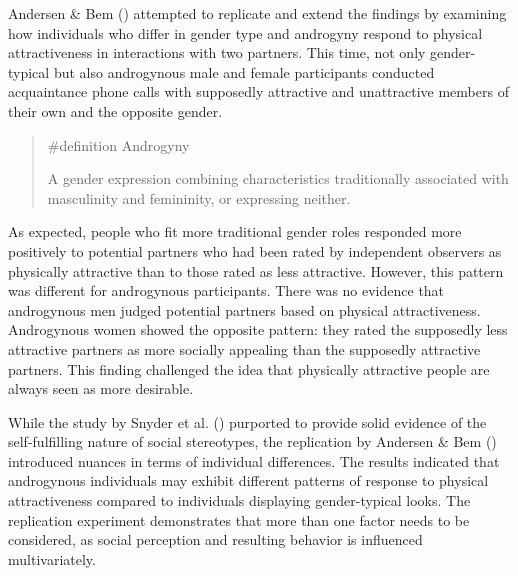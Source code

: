 \documentclass[
  letterpaper,
]{book}
\begin{document}
Andersen \& Bem () attempted to
replicate and extend the findings by examining how individuals who
differ in gender type and androgyny respond to physical attractiveness
in interactions with two partners. This time, not only gender-typical
but also androgynous male and female participants conducted acquaintance
phone calls with supposedly attractive and unattractive members of their
own and the opposite gender.

\begin{quote}
\label{def-androgyny}{\#definition} Androgyny

A gender expression combining characteristics traditionally associated
with masculinity and femininity, or expressing neither.
\end{quote}

As expected, people who fit more traditional gender roles responded more
positively to potential partners who had been rated by independent
observers as physically attractive than to those rated as less
attractive. However, this pattern was different for androgynous
participants. There was no evidence that androgynous men judged
potential partners based on physical attractiveness. Androgynous women
showed the opposite pattern: they rated the supposedly less attractive
partners as more socially appealing than the supposedly attractive
partners. This finding challenged the idea that physically attractive
people are always seen as more desirable.

While the study by Snyder et al.
() purported to provide solid
evidence of the self-fulfilling nature of social stereotypes, the
replication by Andersen \& Bem ()
introduced nuances in terms of individual differences. The results
indicated that androgynous individuals may exhibit different patterns of
response to physical attractiveness compared to individuals displaying
gender-typical looks. The replication experiment demonstrates that more
than one factor needs to be considered, as social perception and
resulting behavior is influenced multivariately.
\end{document}
